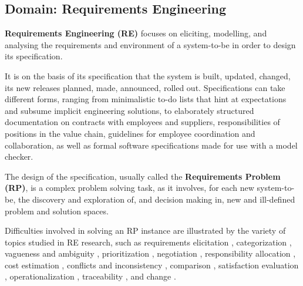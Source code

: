 \documentclass[graybox]{svmult}
\newcommand{\xb}[1]{\textbf{#1}}
\newcommand{\REfull}{Requirements Engineering}
\newcommand{\RE}{RE}
\newcommand{\RPfull}{Requirements Problem}
\newcommand{\RP}{RP}
\begin{document}
%
\subsection{Domain: \REfull}\label{s:introduction:domain}
\xb{\REfull{} (\RE)} focuses on eliciting, modelling, and analysing the requirements and environment of a system-to-be in order to design its specification. 

It is on the basis of its specification that the system is built, updated, changed, its new releases planned, made, announced, rolled out. Specifications can take different forms, ranging from minimalistic to-do lists that hint at expectations and subsume implicit engineering solutions, to elaborately structured documentation on contracts with employees and suppliers, responsibilities of positions in the value chain, guidelines for employee coordination and collaboration, as well as formal software specifications made for use with a model checker. 

The design of the specification, usually called the \xb{\RPfull{} (\RP)}, is a complex problem solving task, as it involves, for each new system-to-be, the discovery and exploration of, and decision making in, new and ill-defined problem and solution spaces. 

Difficulties involved in solving an \RP{} instance are illustrated by the variety of topics studied in \RE{} research, such as requirements elicitation \cite{goguen1993techniques, hickey2004unified, davis2006effectiveness}, categorization \cite{dardenne1993goal, zave1997four, jureta2008revisiting}, vagueness and ambiguity \cite{mylopoulos1992representing, letier2004reasoning, jureta2007clarifying}, prioritization \cite{karlsson1998evaluation, berander2005requirements, herrmann2008requirements}, negotiation \cite{leite1991requirements, boehm1995software, jureta2009analysis}, responsibility allocation \cite{dardenne1993goal, castro2002towards, fuxman2004specifying}, cost estimation \cite{boehm1984software, boehm2000software, sindre2005eliciting}, conflicts and inconsistency \cite{nuseibeh1994framework, heitmeyer1996automated, van1998managing}, comparison \cite{mylopoulos1992representing, letier2004reasoning, liaskos2010integrating}, satisfaction evaluation \cite{boehm1976quantitative, mylopoulos1992representing, krogstie1995towards}, operationalization \cite{giorgini2003reasoning, fuxman2004specifying, ernst2013agile}, traceability \cite{gotel1994analysis, ramesh2001toward, cleland2005utilizing}, and change \cite{cheng2009software, whittle2009relax, brun2009engineering}.
\end{document}
